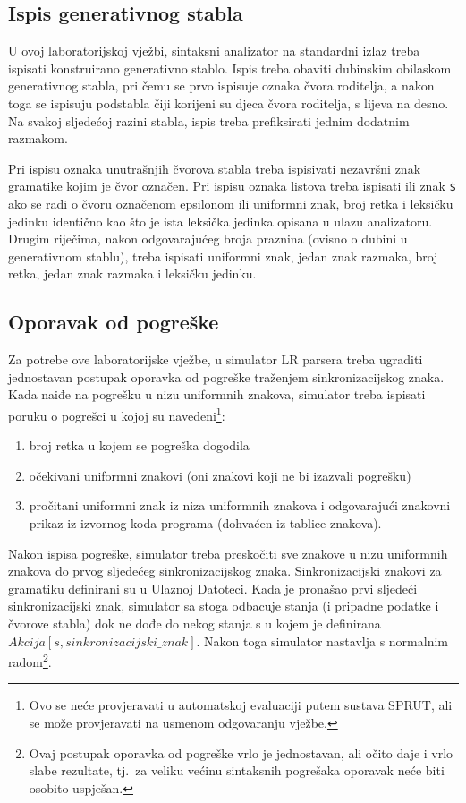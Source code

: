 \documentclass[times, 12pt, utf8]{book}
\begin{document}
\subsection{Ispis generativnog stabla}\label{sec:syn_ispis}
U ovoj laboratorijskoj vježbi, sintaksni analizator na standardni izlaz treba ispisati konstruirano generativno stablo.
Ispis treba obaviti dubinskim obilaskom generativnog stabla, pri čemu se prvo ispisuje oznaka čvora roditelja, a nakon toga se ispisuju podstabla čiji korijeni su djeca čvora roditelja, s lijeva na desno.
Na svakoj sljedećoj razini stabla, ispis treba prefiksirati jednim dodatnim razmakom.

Pri ispisu oznaka unutrašnjih čvorova stabla treba ispisivati nezavršni znak gramatike kojim je čvor označen.
Pri ispisu oznaka listova treba ispisati ili znak \verb|$| ako se radi o čvoru označenom epsilonom ili uniformni znak, broj retka i leksičku jedinku identično kao što je ista leksička jedinka opisana u ulazu analizatoru.
Drugim riječima, nakon odgovarajućeg broja praznina (ovisno o dubini u generativnom stablu), treba ispisati uniformni znak, jedan znak razmaka, broj retka, jedan znak razmaka i leksičku jedinku.

\subsection{Oporavak od pogreške}\label{sec:syn_oporavak}
Za potrebe ove laboratorijske vježbe, u simulator LR parsera treba ugraditi jednostavan postupak oporavka od pogreške traženjem sinkronizacijskog znaka.
Kada naiđe na pogrešku u nizu uniformnih znakova, simulator treba ispisati poruku o pogrešci u kojoj su navedeni\footnote{Ovo se neće provjeravati u automatskoj evaluaciji putem sustava SPRUT, ali se može provjeravati na usmenom odgovaranju vježbe.}:

\begin{enumerate}
\item
broj retka u kojem se pogreška dogodila
\item
očekivani uniformni znakovi (oni znakovi koji ne bi izazvali pogrešku)
\item
pročitani uniformni znak iz niza uniformnih znakova i odgovarajući znakovni prikaz iz izvornog koda programa (dohvaćen iz tablice znakova).
\end{enumerate}

Nakon ispisa pogreške, simulator treba preskočiti sve znakove u nizu uniformnih znakova do prvog sljedećeg sinkronizacijskog znaka.
Sinkronizacijski znakovi za gramatiku definirani su u Ulaznoj Datoteci.
Kada je pronašao prvi sljedeći sinkronizacijski znak, simulator sa stoga odbacuje stanja (i pripadne podatke i čvorove stabla) dok ne dođe do nekog stanja s u kojem je definirana $Akcija[s, sinkronizacijski\_znak]$.
Nakon toga simulator nastavlja s normalnim radom\footnote{Ovaj postupak oporavka od pogreške vrlo je jednostavan, ali očito daje i vrlo slabe rezultate, tj.~za veliku većinu sintaksnih pogrešaka oporavak neće biti osobito uspješan.}.
\end{document}
